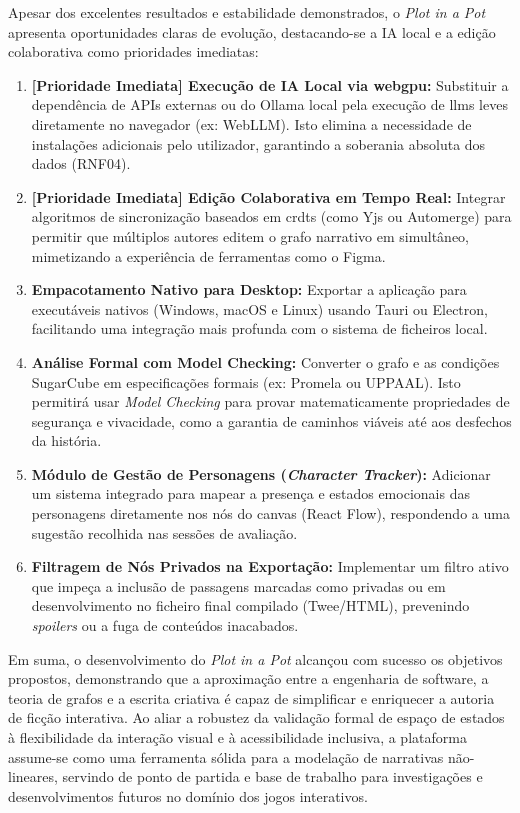 Apesar dos excelentes resultados e estabilidade demonstrados, o \textit{Plot in a Pot} apresenta oportunidades claras de evolução, destacando-se a IA local e a edição colaborativa como prioridades imediatas:

\begin{enumerate}
    \item \textbf{[Prioridade Imediata] Execução de IA Local via \gls{webgpu}:} Substituir a dependência de APIs externas ou do Ollama local pela execução de \glspl{llm} leves diretamente no navegador (ex: WebLLM). Isto elimina a necessidade de instalações adicionais pelo utilizador, garantindo a soberania absoluta dos dados (RNF04).
    \item \textbf{[Prioridade Imediata] Edição Colaborativa em Tempo Real:} Integrar algoritmos de sincronização baseados em \glspl{crdt} (como Yjs ou Automerge) para permitir que múltiplos autores editem o grafo narrativo em simultâneo, mimetizando a experiência de ferramentas como o Figma.
    \item \textbf{Empacotamento Nativo para Desktop:} Exportar a aplicação para executáveis nativos (Windows, macOS e Linux) usando Tauri ou Electron, facilitando uma integração mais profunda com o sistema de ficheiros local.
    \item \textbf{Análise Formal com Model Checking:} Converter o grafo e as condições SugarCube em especificações formais (ex: Promela ou UPPAAL). Isto permitirá usar \textit{Model Checking} para provar matematicamente propriedades de segurança e vivacidade, como a garantia de caminhos viáveis até aos desfechos da história.
    \item \textbf{Módulo de Gestão de Personagens (\textit{Character Tracker}):} Adicionar um sistema integrado para mapear a presença e estados emocionais das personagens diretamente nos nós do canvas (React Flow), respondendo a uma sugestão recolhida nas sessões de avaliação.
    \item \textbf{Filtragem de Nós Privados na Exportação:} Implementar um filtro ativo que impeça a inclusão de passagens marcadas como privadas ou em desenvolvimento no ficheiro final compilado (Twee/HTML), prevenindo \textit{spoilers} ou a fuga de conteúdos inacabados.
\end{enumerate}

Em suma, o desenvolvimento do \textit{Plot in a Pot} alcançou com sucesso os objetivos propostos, demonstrando que a aproximação entre a engenharia de software, a teoria de grafos e a escrita criativa é capaz de simplificar e enriquecer a autoria de ficção interativa. Ao aliar a robustez da validação formal de espaço de estados à flexibilidade da interação visual e à acessibilidade inclusiva, a plataforma assume-se como uma ferramenta sólida para a modelação de narrativas não-lineares, servindo de ponto de partida e base de trabalho para investigações e desenvolvimentos futuros no domínio dos jogos interativos.
